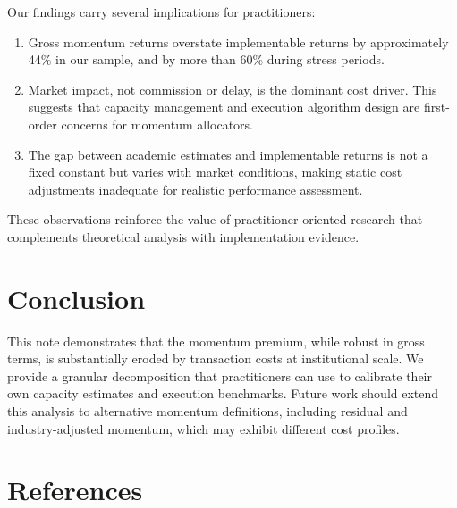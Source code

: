\documentclass{cris}
\begin{document}
Our findings carry several implications for practitioners:

\begin{enumerate}
  \item Gross momentum returns overstate implementable returns by approximately 44\% in our sample, and by more than 60\% during stress periods.
  \item Market impact, not commission or delay, is the dominant cost driver. This suggests that capacity management and execution algorithm design are first-order concerns for momentum allocators.
  \item The gap between academic estimates and implementable returns is not a fixed constant but varies with market conditions, making static cost adjustments inadequate for realistic performance assessment.
\end{enumerate}

These observations reinforce the value of practitioner-oriented research that complements theoretical analysis with implementation evidence.

\section{Conclusion}

This note demonstrates that the momentum premium, while robust in gross terms, is substantially eroded by transaction costs at institutional scale. We provide a granular decomposition that practitioners can use to calibrate their own capacity estimates and execution benchmarks. Future work should extend this analysis to alternative momentum definitions, including residual and industry-adjusted momentum, which may exhibit different cost profiles.

\section{References}

\end{document}
